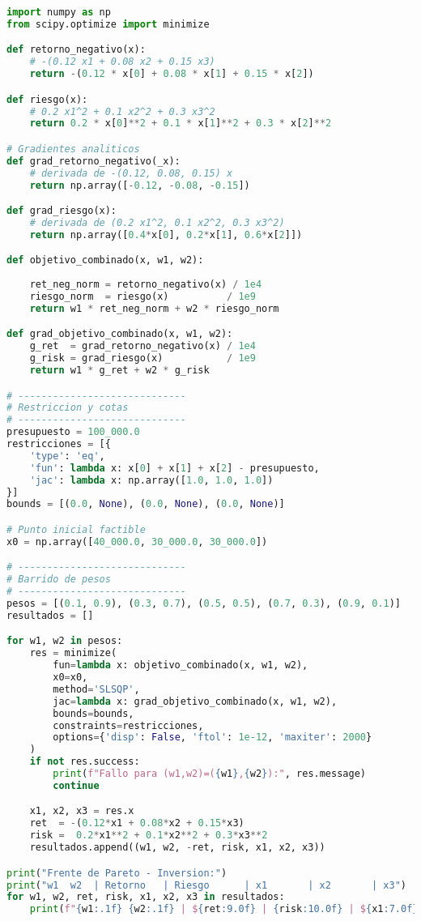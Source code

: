 \documentclass[12pt]{article}
\begin{document}
\begin{lstlisting}[language=Python]
import numpy as np
from scipy.optimize import minimize

def retorno_negativo(x):
    # -(0.12 x1 + 0.08 x2 + 0.15 x3)
    return -(0.12 * x[0] + 0.08 * x[1] + 0.15 * x[2])

def riesgo(x):
    # 0.2 x1^2 + 0.1 x2^2 + 0.3 x3^2
    return 0.2 * x[0]**2 + 0.1 * x[1]**2 + 0.3 * x[2]**2

# Gradientes analiticos
def grad_retorno_negativo(_x):
    # derivada de -(0.12, 0.08, 0.15) x
    return np.array([-0.12, -0.08, -0.15])

def grad_riesgo(x):
    # derivada de (0.2 x1^2, 0.1 x2^2, 0.3 x3^2)
    return np.array([0.4*x[0], 0.2*x[1], 0.6*x[2]])

def objetivo_combinado(x, w1, w2):
  
    ret_neg_norm = retorno_negativo(x) / 1e4
    riesgo_norm  = riesgo(x)          / 1e9
    return w1 * ret_neg_norm + w2 * riesgo_norm

def grad_objetivo_combinado(x, w1, w2):
    g_ret  = grad_retorno_negativo(x) / 1e4
    g_risk = grad_riesgo(x)           / 1e9
    return w1 * g_ret + w2 * g_risk

# -----------------------------
# Restriccion y cotas
# -----------------------------
presupuesto = 100_000.0
restricciones = [{
    'type': 'eq',
    'fun': lambda x: x[0] + x[1] + x[2] - presupuesto,
    'jac': lambda x: np.array([1.0, 1.0, 1.0])
}]
bounds = [(0.0, None), (0.0, None), (0.0, None)]

# Punto inicial factible
x0 = np.array([40_000.0, 30_000.0, 30_000.0])

# -----------------------------
# Barrido de pesos
# -----------------------------
pesos = [(0.1, 0.9), (0.3, 0.7), (0.5, 0.5), (0.7, 0.3), (0.9, 0.1)]
resultados = []

for w1, w2 in pesos:
    res = minimize(
        fun=lambda x: objetivo_combinado(x, w1, w2),
        x0=x0,
        method='SLSQP',
        jac=lambda x: grad_objetivo_combinado(x, w1, w2),
        bounds=bounds,
        constraints=restricciones,
        options={'disp': False, 'ftol': 1e-12, 'maxiter': 2000}
    )
    if not res.success:
        print(f"Fallo para (w1,w2)=({w1},{w2}):", res.message)
        continue

    x1, x2, x3 = res.x
    ret  = -(0.12*x1 + 0.08*x2 + 0.15*x3)
    risk =  0.2*x1**2 + 0.1*x2**2 + 0.3*x3**2
    resultados.append((w1, w2, -ret, risk, x1, x2, x3))

print("Frente de Pareto - Inversion:")
print("w1  w2  | Retorno   | Riesgo      | x1       | x2       | x3")
for w1, w2, ret, risk, x1, x2, x3 in resultados:
    print(f"{w1:.1f} {w2:.1f} | ${ret:9.0f} | {risk:10.0f} | ${x1:7.0f} | ${x2:7.0f} | ${x3:7.0f}")

\end{lstlisting}
\end{document}
